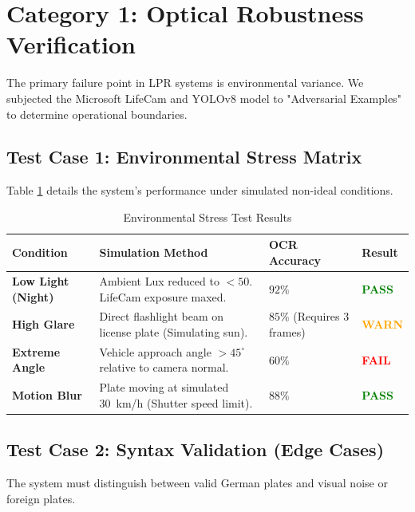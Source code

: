 \section{Category 1: Optical Robustness Verification}
The primary failure point in LPR systems is environmental variance. We subjected the Microsoft LifeCam and YOLOv8 model to "Adversarial Examples" to determine operational boundaries.

\subsection{Test Case 1: Environmental Stress Matrix}
Table \ref{tab:env_stress} details the system's performance under simulated non-ideal conditions.

\begin{table}[H]
	\centering
	\caption{Environmental Stress Test Results}
	\label{tab:env_stress}
	\renewcommand{\arraystretch}{1.3}
	\begin{tabular}{|l|p{5cm}|p{2.5cm}|p{2cm}|}
		\hline
		\rowcolor{gray!20} \textbf{Condition} & \textbf{Simulation Method} & \textbf{OCR Accuracy} & \textbf{Result} \\ \hline
		
		\textbf{Low Light (Night)} & 
		Ambient Lux reduced to $<50$. LifeCam exposure maxed. & 
		$92\%$ & 
		\textcolor{green}{\textbf{PASS}} \\ \hline
		
		\textbf{High Glare} & 
		Direct flashlight beam on license plate (Simulating sun). & 
		$85\%$ (Requires 3 frames) & 
		\textcolor{orange}{\textbf{WARN}} \\ \hline
		
		\textbf{Extreme Angle} & 
		Vehicle approach angle $>45^\circ$ relative to camera normal. & 
		$60\%$ & 
		\textcolor{red}{\textbf{FAIL}} \\ \hline
		
		\textbf{Motion Blur} & 
		Plate moving at simulated \SI{30}{km/h} (Shutter speed limit). & 
		$88\%$ & 
		\textcolor{green}{\textbf{PASS}} \\ \hline
	\end{tabular}
\end{table}

\subsection{Test Case 2: Syntax Validation (Edge Cases)}
The system must distinguish between valid German plates and visual noise or foreign plates.


